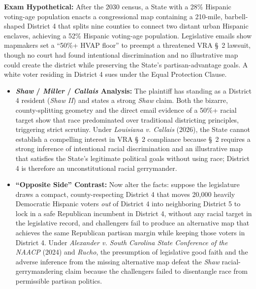 \documentclass[12pt]{article}
\begin{document}
\textbf{Exam Hypothetical:}
After the 2030 census, a State with a 28\% Hispanic voting-age population enacts a congressional map containing a 210-mile, barbell-shaped District 4 that splits nine counties to connect two distant urban Hispanic enclaves, achieving a 52\% Hispanic voting-age population. Legislative emails show mapmakers set a ``50\%+ HVAP floor'' to preempt a threatened VRA \S~2 lawsuit, though no court had found intentional discrimination and no illustrative map could create the district while preserving the State's partisan-advantage goals. A white voter residing in District 4 sues under the Equal Protection Clause.
\begin{itemize}
  \item \textbf{\textit{Shaw} / \textit{Miller} / \textit{Callais} Analysis:} The plaintiff has standing as a District 4 resident (\textit{Shaw II}) and states a strong \textit{Shaw} claim. Both the bizarre, county-splitting geometry and the direct email evidence of a 50\%+ racial target show that race predominated over traditional districting principles, triggering strict scrutiny. Under \textit{Louisiana v. Callais} (2026), the State cannot establish a compelling interest in VRA \S~2 compliance because \S~2 requires a strong inference of intentional racial discrimination and an illustrative map that satisfies the State's legitimate political goals without using race; District 4 is therefore an unconstitutional racial gerrymander.
  \item \textbf{``Opposite Side'' Contrast:} Now alter the facts: suppose the legislature draws a compact, county-respecting District 4 that moves 20,000 heavily Democratic Hispanic voters \textit{out} of District 4 into neighboring District 5 to lock in a safe Republican incumbent in District 4, without any racial target in the legislative record, and challengers fail to produce an alternative map that achieves the same Republican partisan margin while keeping those voters in District 4. Under \textit{Alexander v. South Carolina State Conference of the NAACP} (2024) and \textit{Rucho}, the presumption of legislative good faith and the adverse inference from the missing alternative map defeat the \textit{Shaw} racial-gerrymandering claim because the challengers failed to disentangle race from permissible partisan politics.
\end{itemize}
\end{document}
